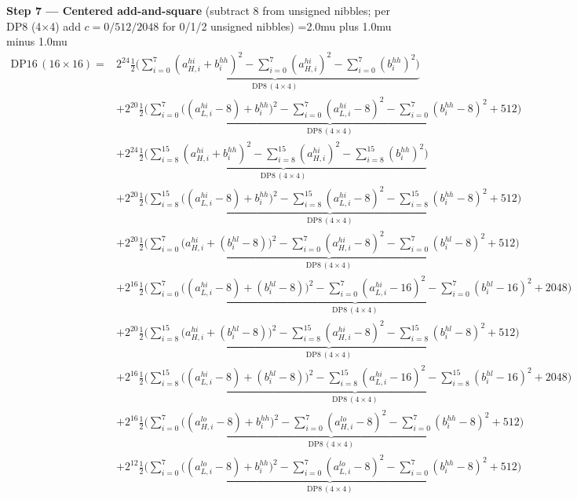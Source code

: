 \documentclass[fleqn]{article}
\newcommand{\DPop}[3]{\mathrm{DP#1}\,(#2\!\times\!#3)}
\begin{document}
\textbf{Step 7 --- Centered add-and-square}\quad
{\small(subtract $8$ from unsigned nibbles; per DP8 (4$\times$4) add $c=0/512/2048$ for 0/1/2 unsigned nibbles)}
{\small\setlength{\jot}{1pt}\medmuskip=2.0mu plus 1.0mu minus 1.0mu
\begin{align*}
\DPop{16}{16}{16} = {}
  & 2^{24}\underbrace{\tfrac12\Big(\sum_{i=0}^{7}(a_{H,i}^{hi}{+}b_i^{hh})^2 - \sum_{i=0}^{7}(a_{H,i}^{hi})^2 - \sum_{i=0}^{7}(b_i^{hh})^2\Big)}_{\DPop{8}{4}{4}} \\[0.25em]
  & + 2^{20}\underbrace{\tfrac12\Big(\sum_{i=0}^{7}\big((a_{L,i}^{hi}{-}8){+}b_i^{hh}\big)^2 - \sum_{i=0}^{7}(a_{L,i}^{hi}{-}8)^2 - \sum_{i=0}^{7}(b_i^{hh}{-}8)^2 + 512\Big)}_{\DPop{8}{4}{4}} \\[0.25em]
  & + 2^{24}\underbrace{\tfrac12\Big(\sum_{i=8}^{15}(a_{H,i}^{hi}{+}b_i^{hh})^2 - \sum_{i=8}^{15}(a_{H,i}^{hi})^2 - \sum_{i=8}^{15}(b_i^{hh})^2\Big)}_{\DPop{8}{4}{4}} \\[0.25em]
  & + 2^{20}\underbrace{\tfrac12\Big(\sum_{i=8}^{15}\big((a_{L,i}^{hi}{-}8){+}b_i^{hh}\big)^2 - \sum_{i=8}^{15}(a_{L,i}^{hi}{-}8)^2 - \sum_{i=8}^{15}(b_i^{hh}{-}8)^2 + 512\Big)}_{\DPop{8}{4}{4}} \\[0.25em]
  & + 2^{20}\underbrace{\tfrac12\Big(\sum_{i=0}^{7}\big(a_{H,i}^{hi}{+}(b_i^{hl}{-}8)\big)^2 - \sum_{i=0}^{7}(a_{H,i}^{hi}{-}8)^2 - \sum_{i=0}^{7}(b_i^{hl}{-}8)^2 + 512\Big)}_{\DPop{8}{4}{4}} \\[0.25em]
  & + 2^{16}\underbrace{\tfrac12\Big(\sum_{i=0}^{7}\big((a_{L,i}^{hi}{-}8){+}(b_i^{hl}{-}8)\big)^2 - \sum_{i=0}^{7}(a_{L,i}^{hi}{-}16)^2 - \sum_{i=0}^{7}(b_i^{hl}{-}16)^2 + 2048\Big)}_{\DPop{8}{4}{4}} \\[0.25em]
  & + 2^{20}\underbrace{\tfrac12\Big(\sum_{i=8}^{15}\big(a_{H,i}^{hi}{+}(b_i^{hl}{-}8)\big)^2 - \sum_{i=8}^{15}(a_{H,i}^{hi}{-}8)^2 - \sum_{i=8}^{15}(b_i^{hl}{-}8)^2 + 512\Big)}_{\DPop{8}{4}{4}} \\[0.25em]
  & + 2^{16}\underbrace{\tfrac12\Big(\sum_{i=8}^{15}\big((a_{L,i}^{hi}{-}8){+}(b_i^{hl}{-}8)\big)^2 - \sum_{i=8}^{15}(a_{L,i}^{hi}{-}16)^2 - \sum_{i=8}^{15}(b_i^{hl}{-}16)^2 + 2048\Big)}_{\DPop{8}{4}{4}} \\[0.25em]
  & + 2^{16}\underbrace{\tfrac12\Big(\sum_{i=0}^{7}\big((a_{H,i}^{lo}{-}8){+}b_i^{hh}\big)^2 - \sum_{i=0}^{7}(a_{H,i}^{lo}{-}8)^2 - \sum_{i=0}^{7}(b_i^{hh}{-}8)^2 + 512\Big)}_{\DPop{8}{4}{4}} \\[0.25em]
  & + 2^{12}\underbrace{\tfrac12\Big(\sum_{i=0}^{7}\big((a_{L,i}^{lo}{-}8){+}b_i^{hh}\big)^2 - \sum_{i=0}^{7}(a_{L,i}^{lo}{-}8)^2 - \sum_{i=0}^{7}(b_i^{hh}{-}8)^2 + 512\Big)}_{\DPop{8}{4}{4}} \\[0.25em]

\end{align*}}
\end{document}
